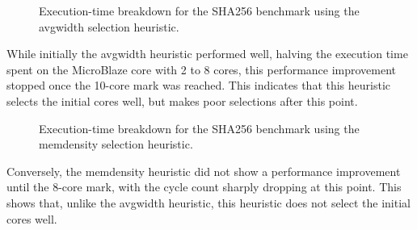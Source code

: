 \documentclass{UoYCSproject}
\begin{document}
\begin{figure}[H]
\caption{Execution-time breakdown for the SHA256 benchmark using the avgwidth selection heuristic.}
\label{fig:breakdownAvgWidthSHA256}
\end{figure}

While initially the avgwidth heuristic performed well, halving the execution time spent on the MicroBlaze core
with 2 to 8 cores, this performance improvement stopped once the 10-core mark was reached. This indicates
that this heuristic selects the initial cores well, but makes poor selections after this point.

\begin{figure}[H]
\caption{Execution-time breakdown for the SHA256 benchmark using the memdensity selection heuristic.}
\label{fig:breakdownMemDensitySHA256}
\end{figure}

Conversely, the memdensity heuristic did not show a performance improvement until the 8-core mark, with
the cycle count sharply dropping at this point. This shows that, unlike the avgwidth heuristic, this heuristic
does not select the initial cores well.
\end{document}

